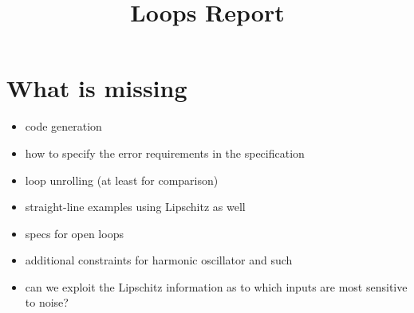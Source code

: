 \documentclass[10pt]{article}
\title{Loops Report}
\author{}
\begin{document}
\maketitle

\section{What is missing}
\begin{itemize}
\item code generation

\item how to specify the error requirements in the specification

\item loop unrolling (at least for comparison)

\item straight-line examples using Lipschitz as well

\item specs for open loops

\item additional constraints for harmonic oscillator and such

\item can we exploit the Lipschitz information as to which
inputs are most sensitive to noise?
\end{itemize}




\end{document}

